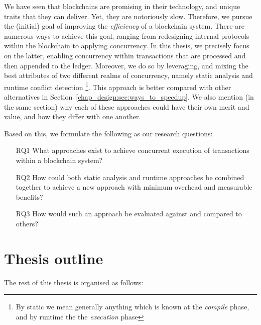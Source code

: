 We have seen that blockchains are promising in their technology, and unique traits that they can
deliver. Yet, they are notoriously slow. Therefore, we  pursue the (initial) goal of improving
the \textit{efficiency} of a blockchain system. There are numerous ways to
achieve this goal, ranging from redesigning internal protocols within the blockchain to applying
concurrency. In this thesis, we precisely focus on the latter, enabling concurrency within
transactions that are processed and then appended to the ledger. Moreover, we do so by leveraging,
and mixing the best attributes of two different realms of concurrency, namely static analysis and
runtime conflict detection \footnote{By static we mean generally anything which is known at the
\textit{compile} phase, and by runtime the the \textit{execution} phase}. This approach is better
compared with other alternatives in Section~\ref{chap_design:sec:ways_to_speedup}. We also mention (in
the same section) why each of these approaches could have their own merit and value, and how they
differ with one another.

Based on this, we formulate the following as our research questions:

 \begin{enumerate}
     \item [RQ1] What approaches exist to achieve concurrent execution of transactions within a blockchain
     system?
	 \item [RQ2] How could both static analysis and runtime approaches be combined together to achieve a new approach with minimum overhead and measurable benefits?  
	 \item [RQ3] How would such an approach be evaluated against and compared to others?
 \end{enumerate}

\section{Thesis outline}
The rest of this thesis is organised as follows: 

